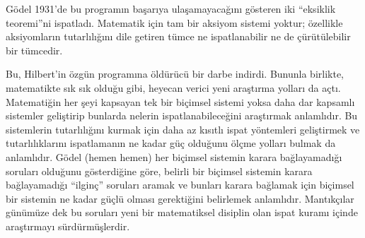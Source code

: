 \documentclass[../../../include/open-logic-section]{subfiles}
\begin{document}
G\"odel 1931'de bu programın başarıya ulaşamayacağını gösteren iki
``eksiklik teoremi''ni ispatladı. Matematik için tam bir aksiyom sistemi
yoktur; özellikle aksiyomların tutarlılığını dile getiren tümce ne
ispatlanabilir ne de çürütülebilir bir tümcedir.

Bu, Hilbert'in özgün programına öldürücü bir darbe indirdi. Bununla birlikte,
matematikte sık sık olduğu gibi, heyecan verici yeni araştırma yolları da
açtı. Matematiğin her şeyi kapsayan tek bir biçimsel sistemi yoksa daha dar
kapsamlı sistemler geliştirip bunlarda nelerin ispatlanabileceğini
araştırmak anlamlıdır. Bu sistemlerin tutarlılığını kurmak için daha az
kısıtlı ispat yöntemleri geliştirmek ve tutarlılıklarını ispatlamanın ne
kadar güç olduğunu ölçme yolları bulmak da anlamlıdır. G\"odel (hemen
hemen) her biçimsel sistemin karara bağlayamadığı soruları olduğunu
gösterdiğine göre, belirli bir biçimsel sistemin karara bağlayamadığı
``ilginç'' soruları aramak ve bunları karara bağlamak için biçimsel bir
sistemin ne kadar güçlü olması gerektiğini belirlemek anlamlıdır.
Mantıkçılar günümüze dek bu soruları yeni bir matematiksel disiplin olan
ispat kuramı içinde araştırmayı sürdürmüşlerdir.
\end{document}

